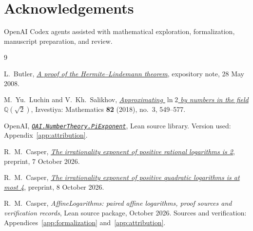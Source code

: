 \documentclass[11pt]{article}
\theoremstyle{definition}
\theoremstyle{remark}
\theoremstyle{plain}
\newcommand{\Q}{\mathbb Q}
\begin{document}
\section*{Acknowledgements}
OpenAI Codex agents assisted with mathematical exploration, formalization,
manuscript preparation, and review.

\begin{thebibliography}{9}

L.~Butler,
\emph{\href{https://people.maths.bris.ac.uk/~malab/PDFs/HL.pdf}{A proof of the Hermite--Lindemann theorem}},
expository note, 28 May 2008.

M.~Yu.~Luchin and V.~Kh.~Salikhov,
\emph{\href{https://www.mathnet.ru/php/getFT.phtml?jrnid=im&option_lang=eng&paperid=8518&what=fullteng}{Approximating \(\ln2\) by numbers in the field \(\Q(\sqrt2)\)}},
Izvestiya: Mathematics \textbf{82} (2018), no.~3, 549--577.

OpenAI,
\emph{\href{https://github.com/openai/math/tree/adc7f1241b42e322a6451854ab7e4b4c146bf78a}{\texttt{OAI.NumberTheory.PiExponent}}},
Lean source library. Version used: Appendix~\ref{app:attribution}.

R.~M.~Casper,
\emph{\href{https://github.com/Mattie/math/blob/51c9a62e1f8dde60f75201c14b35b42abb04eb2a/preprints/The-irrationality-exponent-of-positive-rational-logarithms-is-2-October-7-2026/paper.pdf}{The irrationality exponent of positive rational logarithms is 2}},
preprint, 7 October 2026.

R.~M.~Casper,
\emph{\href{https://github.com/Mattie/math/blob/51c9a62e1f8dde60f75201c14b35b42abb04eb2a/preprints/The-irrationality-exponent-of-positive-quadratic-logarithms-is-at-most-4-October-8-2026/paper.pdf}{The irrationality exponent of positive quadratic logarithms is at most 4}},
preprint, 8 October 2026.

R.~M.~Casper,
\emph{AffineLogarithms: paired affine logarithms, proof sources and
verification records}, Lean source package, October 2026.
Sources and verification: Appendices~\ref{app:formalization}
and~\ref{app:attribution}.

\end{thebibliography}
\end{document}

